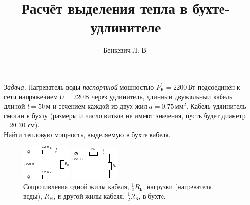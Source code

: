 \documentclass[letterpaper,twoside,12pt]{article}
\title{Расчёт выделения тепла в бухте-удлинителе}
\author{Бенкевич Л. В.}
\begin{document}
\maketitle 

\emph{Задача.} Нагреватель воды \emph{паспортной} мощностью $P^*_\text{Н} = 2200 \, \text{Вт}$ подсоединён к сети напряжением $U = 220 \, \text{В}$ через удлинитель, длинный двужильный кабель длиной $l = 50 \, \text{м}$ и сечением каждой из двух жил $a = 0.75 \, \text{мм}^2$. Кабель-удлинитель смотан в бухту (размеры и число витков не имеют значения, пусть будет диаметр ~ 20-30 см). \\

Найти тепловую мощность, выделяемую в бухте кабеля.


\begin{figure}[h]
    \centering
    \begin{minipage}{0.45\textwidth}
        \centering
        \includegraphics[width=\linewidth]{circuit_Rb_Rn_Rb.pdf}
        \caption{Сопротивления одной жилы кабеля, $\frac{1}{2} R_\text{Б}$, нагрузки (нагревателя воды), $R_\text{Н}$, и другой жилы кабеля, $\frac{1}{2} R_\text{Б}$,  в бухте.}
        \label{rb_rn_rb}
    \end{minipage}
    \hfill
    \begin{minipage}{0.45\textwidth}
        \centering
        \includegraphics[width=\linewidth]{circuit_Rb_Rn.pdf}

\end{minipage}
\end{figure}
\end{document}
